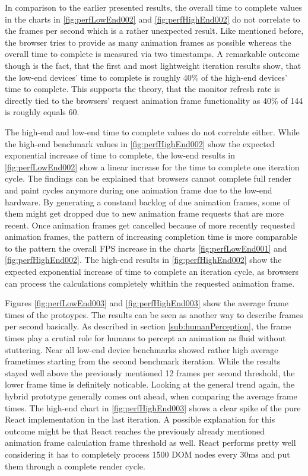 In comparison to the earlier presented results, the overall time to complete values in the charts in \ref{fig:perfLowEnd002} and \ref{fig:perfHighEnd002} do not correlate to the frames per second which is a rather unexpected result. Like mentioned before, the browser tries to provide as many animation frames as possible whereas the overall time to complete is measured via two timestamps. A remarkable outcome though is the fact, that the first and most lightweight iteration results show, that the low-end devices' time to complete is roughly 40\% of the high-end devices' time to complete. This supports the theory, that the monitor refresh rate is directly tied to the browsers' request animation frame functionality as 40\% of 144 is roughly equals 60. 

The high-end and low-end time to complete values do not correlate either. While the high-end benchmark values in \ref{fig:perfHighEnd002} show the expected exponential increase of time to complete, the low-end results in \ref{fig:perfLowEnd002} show a linear increase for the time to complete one iteration cycle. The findings can be explained that browsers cannot complete full render and paint cycles anymore during one animation frame due to the low-end hardware. By generating a constand backlog of due animation frames, some of them might get dropped due to new animation frame requests that are more recent. Once animation frames get cancelled because of more recently requested animation frames, the pattern of increasing completion time is more comparable to the pattern the overall FPS increase in the charts \ref{fig:perfLowEnd001} and \ref{fig:perfHighEnd002}. The high-end results in \ref{fig:perfHighEnd002} show the expected exponential increase of time to complete an iteration cycle, as browsers can process the calculations completely whithin the requested animation frame.

Figures \ref{fig:perfLowEnd003} and \ref{fig:perfHighEnd003} show the average frame times of the protoypes. The results can be seen as another way to describe frames per second basically. As described in section \ref{sub:humanPerception}, the frame times play a crutial role for humans to percept an animation as fluid without stuttering. Near all low-end device benchmarks showed rather high average frametimes starting from the second benchmark iteration. While the results stayed well above the previously mentioned 12 frames per second threshold, the lower frame time is definitely noticable. Looking at the general trend again, the hybrid prototype generally comes out ahead, when comparing the average frame times. The high-end chart in \ref{fig:perfHighEnd003} shows a clear spike of the pure React implementation in the last iteration. A possible explanation for this outcome might be that React reaches the previously already mentioned animation frame calculation frame threshold as well. React performs pretty well considering it has to completely process 1500 DOM nodes every 30ms and put them through a complete render cycle.

